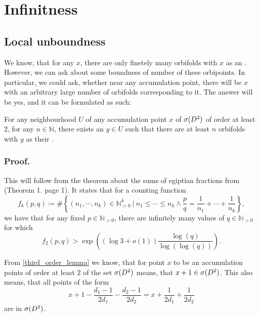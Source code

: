 \section{Infinitness}
\subsection{Local unboundness}
We know, that for any $x$, there are only finetely many orbifolds with $x$ as an \Eoc . 
However, we can ask about some boundness of number of these orbipoints. 
In particular, we could ask, whether near any accumulation point, there will be $x$ with an 
arbitrary large number of orbifolds corresponding to it. 
The answer will be yes, and it can be formulated as such:
\begin{theorem}\label{unboundness}
For any neighbourhood $U$ of any accumulation point $x$ of ${{\sigma}(D^2)}$ of order at least $2$, for any 
$n\in \mathbb{N}$, 
there exists an $y\in U$ such that there are at least $n$ orbifolds with $y$ as their 
\Eoc.
\end{theorem}
\subsubsection{Proof.}
This will follow from the theorem about the sums of egiptian fractions from \cite{Browning2011} 
(Theorem 1. page 1).
It states that for a counting function
\begin{equation}
f_k(p,q) \coloneqq 
\#\left\{(n_1, \cdots, n_k)\in \mathbb{N}_{>0}^k\ \Big|\ n_1 \leq \cdots \leq n_k 
\land \frac{p}{q} = \frac{1}{n_1} + \cdots + \frac{1}{n_k}\right\},
\end{equation}
we have that for any fixed $p\in\mathbb{N}_{>0}$, there are infinitely many values of 
$q\in\mathbb{N}_{>0}$ for which
\begin{equation}
f_2(p,q) > \exp\left((\log{3}+o(1))\frac{\log(q)}{\log(\log(q))}\right).
\end{equation}

From \ref{third_order_lemma} we know, that for point $x$ to be an accumulation points of order 
at least $2$ of the set ${{\sigma}(D^2)}$ means, that $x + 1 \in {{\sigma}(D^2)}$. This also means, that 
all points of the form 
\begin{equation}\label{pq condition}
x + 1 - \frac{d_1-1}{2d_1} - \frac{d_2-1}{2d_2} = x + \frac{1}{2d_1} + \frac{1}{2d_2}
\end{equation} 
are in ${{\sigma}(D^2)}$. 

